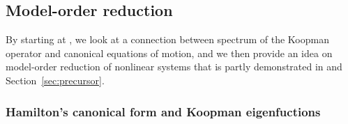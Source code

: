 \documentclass[a4paper,10pt]{article}
\begin{document}
\subsection{Model-order reduction}
\label{subsec:MOR}

By starting at \cite{Mauroy_PD261}, we look at a connection between spectrum of the Koopman operator and canonical equations of motion, and we then provide an idea on model-order reduction of nonlinear systems that is  partly demonstrated in \cite{Susuki_IEEETPWRS27} and Section~\ref{sec:precursor}. 

\subsubsection{Hamilton's canonical form and Koopman eigenfuctions}
\label{subsec:MOR-1}
\end{document}
